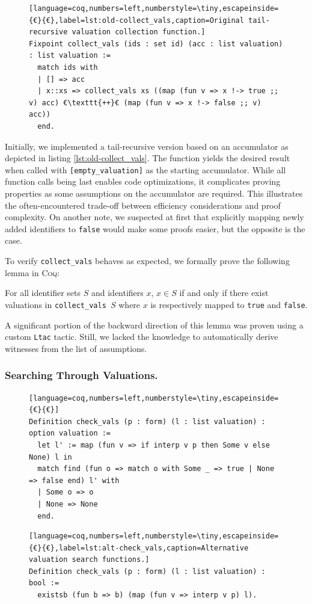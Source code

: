 \begin{figure}[t]
    \begin{lstlisting}[language=coq,numbers=left,numberstyle=\tiny,escapeinside={€}{€},label=lst:old-collect_vals,caption=Original tail-recursive valuation collection function.]
Fixpoint collect_vals (ids : set id) (acc : list valuation) : list valuation :=
  match ids with
  | [] => acc
  | x::xs => collect_vals xs ((map (fun v => x !-> true ;; v) acc) €\texttt{++}€ (map (fun v => x !-> false ;; v) acc))
  end.
    \end{lstlisting}
\end{figure}

Initially, we implemented a tail-recursive version based on an accumulator as depicted in listing \ref{lst:old-collect_vals}.
The function yields the desired result when called with \texttt{[empty\_valuation]} as the starting accumulator.
While all function calls being last enables code optimizations, it complicates proving properties as some assumptions on the accumulator are required.
This illustrates the often-encountered trade-off between efficiency considerations and proof complexity.
On another note, we suspected at first that explicitly mapping newly added identifiers to \texttt{false} would make some proofs easier, but the opposite is the case.

To verify \texttt{collect\_vals} behaves as expected, we formally prove the following lemma in \textsc{Coq}:
\begin{lemma}
    For all identifier sets $S$ and identifiers $x$, $x \in S$ if and only if there exist valuations in \texttt{collect\_vals $S$} where $x$ is respectively mapped to \texttt{true} and \texttt{false}.
\end{lemma}
A significant portion of the backward direction of this lemma was proven using a custom \texttt{Ltac} tactic. 
Still, we lacked the knowledge to automatically derive witnesses from the list of assumptions.

\subsubsection{Searching Through Valuations.}

\begin{figure}[t]
    \begin{lstlisting}[language=coq,numbers=left,numberstyle=\tiny,escapeinside={€}{€}]
Definition check_vals (p : form) (l : list valuation) : option valuation :=
  let l' := map (fun v => if interp v p then Some v else None) l in
  match find (fun o => match o with Some _ => true | None => false end) l' with
  | Some o => o
  | None => None
  end.
    \end{lstlisting}
    \begin{lstlisting}[language=coq,numbers=left,numberstyle=\tiny,escapeinside={€}{€},label=lst:alt-check_vals,caption=Alternative valuation search functions.]
Definition check_vals (p : form) (l : list valuation) : bool :=
  existsb (fun b => b) (map (fun v => interp v p) l).
    \end{lstlisting}
\end{figure}

